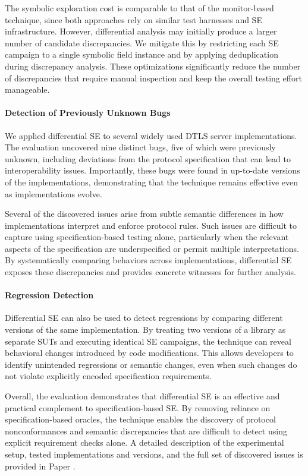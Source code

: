 The symbolic exploration cost is comparable to that of the monitor-based technique, since both approaches rely on similar test harnesses and SE infrastructure.
However, differential analysis may initially produce a larger number of candidate discrepancies.
We mitigate this by restricting each SE campaign to a single symbolic field instance and by applying deduplication during discrepancy analysis.
These optimizations significantly reduce the number of discrepancies that require manual inspection and keep the overall testing effort manageable.

\paragraph{Detection of Previously Unknown Bugs}
We applied differential SE to several widely used DTLS server implementations.
The evaluation uncovered nine distinct bugs, five of which were previously unknown, including deviations from the protocol specification that can lead to interoperability issues.
Importantly, these bugs were found in up-to-date versions of the implementations, demonstrating that the technique remains effective even as implementations evolve.

Several of the discovered issues arise from subtle semantic differences in how implementations interpret and enforce protocol rules.
Such issues are difficult to capture using specification-based testing alone, particularly when the relevant aspects of the specification are underspecified or permit multiple interpretations.
By systematically comparing behaviors across implementations, differential SE exposes these discrepancies and provides concrete witnesses for further analysis.

\paragraph{Regression Detection}
Differential SE can also be used to detect regressions by comparing different versions of the same implementation.
By treating two versions of a library as separate SUTs and executing identical SE campaigns, the technique can reveal behavioral changes introduced by code modifications.
This allows developers to identify unintended regressions or semantic changes, even when such changes do not violate explicitly encoded specification requirements.

Overall, the evaluation demonstrates that differential SE is an effective and practical complement to specification-based SE.
By removing reliance on specification-based oracles, the technique enables the discovery of protocol nonconformances and semantic discrepancies that are difficult to detect using explicit requirement checks alone.
A detailed description of the experimental setup, tested implementations and versions, and the full set of discovered issues is provided in Paper .

